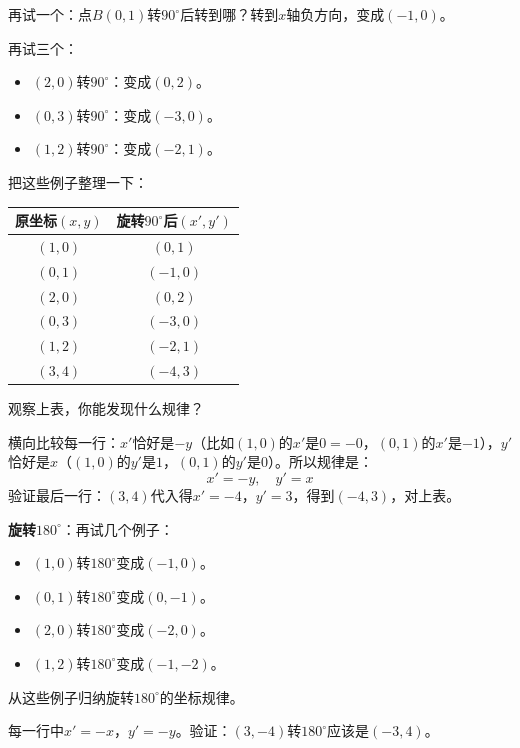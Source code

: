 再试一个：点$B(0,1)$转$90^\circ$后转到哪？转到$x$轴负方向，变成$(-1,0)$。

再试三个：
\begin{itemize}
\item $(2,0)$转$90^\circ$：变成$(0,2)$。
\item $(0,3)$转$90^\circ$：变成$(-3,0)$。
\item $(1,2)$转$90^\circ$：变成$(-2,1)$。
\end{itemize}

把这些例子整理一下：

\begin{center}
\begin{tabular}{c|c}
原坐标$(x,y)$ & 旋转$90^\circ$后$(x',y')$\\\hline
$(1,0)$ & $(0,1)$\\
$(0,1)$ & $(-1,0)$\\
$(2,0)$ & $(0,2)$\\
$(0,3)$ & $(-3,0)$\\
$(1,2)$ & $(-2,1)$\\
$(3,4)$ & $(-4,3)$
\end{tabular}
\end{center}

\begin{example}
观察上表，你能发现什么规律？
\end{example}
\begin{solution}
横向比较每一行：$x'$恰好是$-y$（比如$(1,0)$的$x'$是$0=-0$，$(0,1)$的$x'$是$-1$），$y'$恰好是$x$（$(1,0)$的$y'$是$1$，$(0,1)$的$y'$是$0$）。所以规律是：
\[
x'=-y,\quad y'=x
\]
验证最后一行：$(3,4)$代入得$x'=-4$，$y'=3$，得到$( -4,3)$，对上表。
\end{solution}

\textbf{旋转$180^\circ$}：再试几个例子：
\begin{itemize}
\item $(1,0)$转$180^\circ$变成$(-1,0)$。
\item $(0,1)$转$180^\circ$变成$(0,-1)$。
\item $(2,0)$转$180^\circ$变成$(-2,0)$。
\item $(1,2)$转$180^\circ$变成$(-1,-2)$。
\end{itemize}

\begin{example}
从这些例子归纳旋转$180^\circ$的坐标规律。
\end{example}
\begin{solution}
每一行中$x'=-x$，$y'=-y$。验证：$(3,-4)$转$180^\circ$应该是$(-3,4)$。
\end{solution}

